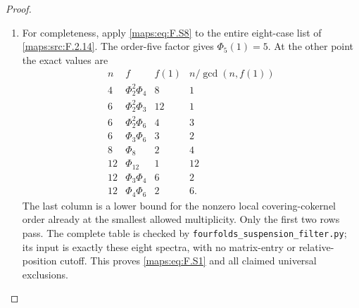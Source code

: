 \begin{proof}
\begin{enumerate}[label=\arabic*.]
\item For completeness, apply \eqref{maps:eq:F.S8} to the entire eight-case
list of \ref{maps:src:F.2.14}.  The order-five factor gives $\Phi_5(1)=5$.
At the other point the exact values are
\[
\begin{array}{c|c|r|r}
 n&f&f(1)&n/\gcd(n,f(1))\\\hline
 4&\Phi_2^2\Phi_4&8&1\\
 6&\Phi_2^2\Phi_3&12&1\\
 6&\Phi_2^2\Phi_6&4&3\\
 6&\Phi_3\Phi_6&3&2\\
 8&\Phi_8&2&4\\
 12&\Phi_{12}&1&12\\
 12&\Phi_3\Phi_4&6&2\\
 12&\Phi_4\Phi_6&2&6.
\end{array}
 \tag{F.S9}\label{maps:eq:F.S9}
\]
The last column is a lower bound for the nonzero local
covering-cokernel order already at the smallest allowed
multiplicity.  Only the first two rows pass.
The complete table is checked by
\texttt{fourfolds\_suspension\_filter.py}; its input is
exactly these eight spectra, with no matrix-entry or
relative-position cutoff.  This proves \eqref{maps:eq:F.S1} and all
claimed universal exclusions.

\end{enumerate}
\end{proof}




